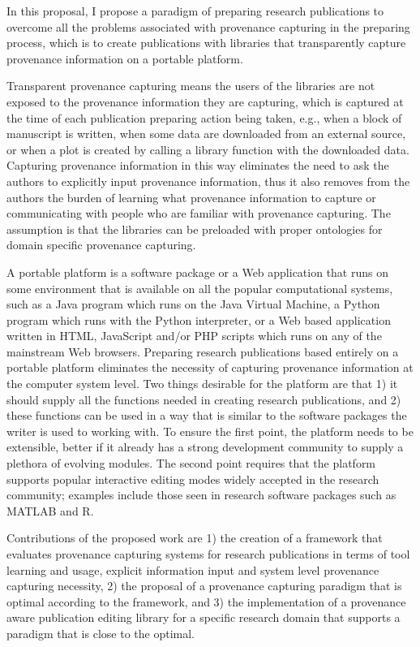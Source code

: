 In this proposal, I propose a paradigm of preparing research publications to overcome all the problems associated with provenance capturing in the preparing process, which is to create publications with libraries that transparently capture provenance information on a portable platform.

Transparent provenance capturing means the users of the libraries are not exposed to the provenance information they are capturing, which is captured at the time of each publication preparing action being taken, e.g., when a block of manuscript is written, when some data are downloaded from an external source, or when a plot is created by calling a library function with the downloaded data. Capturing provenance information in this way eliminates the need to ask the authors to explicitly input provenance information, thus it also removes from the authors the burden of learning what provenance information to capture or communicating with people who are familiar with provenance capturing. The assumption is that the libraries can be preloaded with proper ontologies for domain specific provenance capturing.

A portable platform is a software package or a Web application that runs on some environment that is available on all the popular computational systems, such as a Java program which runs on the Java Virtual Machine, a Python program which runs with the Python interpreter, or a Web based application written in HTML, JavaScript and/or PHP scripts which runs on any of the mainstream Web browsers. Preparing research publications based entirely on a portable platform eliminates the necessity of capturing provenance information at the computer system level. Two things desirable for the platform are that 1) it should supply all the functions needed in creating research publications, and 2) these functions can be used in a way that is similar to the software packages the writer is used to working with. To ensure the first point, the platform needs to be extensible, better if it already has a strong development community to supply a plethora of evolving modules. The second point requires that the platform supports popular interactive editing modes widely accepted in the research community; examples include those seen in research software packages such as MATLAB and R.

Contributions of the proposed work are 1) the creation of a framework that evaluates provenance capturing systems for research publications in terms of tool learning and usage, explicit information input and system level provenance capturing necessity, 2) the proposal of a provenance capturing paradigm that is optimal according to the framework, and 3) the implementation of a provenance aware publication editing library for a specific research domain that supports a paradigm that is close to the optimal. 

